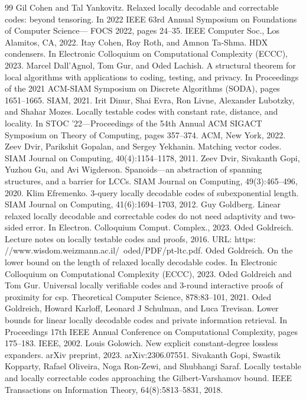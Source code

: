 \begin{thebibliography}{99}
 Gil Cohen and Tal Yankovitz. Relaxed locally decodable and correctable codes: beyond tensoring. In 2022 IEEE 63rd Annual Symposium on Foundations of Computer Science— FOCS 2022, pages 24–35. IEEE Computer Soc., Los Alamitos, CA, 2022.
 Itay Cohen, Roy Roth, and Amnon Ta-Shma. HDX condensers. In Electronic Colloquium on Computational Complexity (ECCC), 2023.
 Marcel Dall’Agnol, Tom Gur, and Oded Lachish. A structural theorem for local algorithms with applications to coding, testing, and privacy. In Proceedings of the 2021 ACM-SIAM Symposium on Discrete Algorithms (SODA), pages 1651–1665. SIAM, 2021.
 Irit Dinur, Shai Evra, Ron Livne, Alexander Lubotzky, and Shahar Mozes. Locally testable codes with constant rate, distance, and locality. In STOC ’22—Proceedings of the 54th Annual ACM SIGACT Symposium on Theory of Computing, pages 357–374. ACM, New York, 2022.
 Zeev Dvir, Parikshit Gopalan, and Sergey Yekhanin. Matching vector codes. SIAM Journal on Computing, 40(4):1154–1178, 2011.
 Zeev Dvir, Sivakanth Gopi, Yuzhou Gu, and Avi Wigderson. Spanoids—an abstraction of spanning structures, and a barrier for LCCs. SIAM Journal on Computing, 49(3):465–496, 2020.
 Klim Efremenko. 3-query locally decodable codes of subexponential length. SIAM Journal on Computing, 41(6):1694–1703, 2012.
 Guy Goldberg. Linear relaxed locally decodable and correctable codes do not need adaptivity and two-sided error. In Electron. Colloquium Comput. Complex., 2023.
 Oded Goldreich. Lecture notes on locally testable codes and proofs, 2016. URL: https: //www.wisdom.weizmann.ac.il/~oded/PDF/pt-ltc.pdf.
 Oded Goldreich. On the lower bound on the length of relaxed locally decodable codes. In Electronic Colloquium on Computational Complexity (ECCC), 2023.
 Oded Goldreich and Tom Gur. Universal locally verifiable codes and 3-round interactive proofs of proximity for csp. Theoretical Computer Science, 878:83–101, 2021.
 Oded Goldreich, Howard Karloff, Leonard J Schulman, and Luca Trevisan. Lower bounds for linear locally decodable codes and private information retrieval. In Proceedings 17th IEEE Annual Conference on Computational Complexity, pages 175–183. IEEE, 2002.
 Louis Golowich. New explicit constant-degree lossless expanders. arXiv preprint, 2023. arXiv:2306.07551.
 Sivakanth Gopi, Swastik Kopparty, Rafael Oliveira, Noga Ron-Zewi, and Shubhangi Saraf. Locally testable and locally correctable codes approaching the Gilbert-Varshamov bound. IEEE Transactions on Information Theory, 64(8):5813–5831, 2018.

\end{thebibliography}

